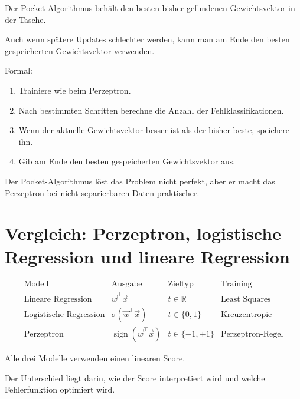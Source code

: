 \begin{conceptbox}
Der Pocket-Algorithmus behält den besten bisher gefundenen Gewichtsvektor in der Tasche.

Auch wenn spätere Updates schlechter werden, kann man am Ende den besten gespeicherten Gewichtsvektor verwenden.
\end{conceptbox}

Formal:

\begin{enumerate}
    \item Trainiere wie beim Perzeptron.
    \item Nach bestimmten Schritten berechne die Anzahl der Fehlklassifikationen.
    \item Wenn der aktuelle Gewichtsvektor besser ist als der bisher beste, speichere ihn.
    \item Gib am Ende den besten gespeicherten Gewichtsvektor aus.
\end{enumerate}

\begin{notebox}
Der Pocket-Algorithmus löst das Problem nicht perfekt, aber er macht das Perzeptron bei nicht separierbaren Daten praktischer.
\end{notebox}

\section{Vergleich: Perzeptron, logistische Regression und lineare Regression}

\[
\begin{array}{c|c|c|c}
\text{Modell}
&
\text{Ausgabe}
&
\text{Zieltyp}
&
\text{Training}
\\
\hline
\text{Lineare Regression}
&
\vec{w}^{\top}\vec{x}
&
t\in\mathbb{R}
&
\text{Least Squares}
\\
\hline
\text{Logistische Regression}
&
\sigma(\vec{w}^{\top}\vec{x})
&
t\in\{0,1\}
&
\text{Kreuzentropie}
\\
\hline
\text{Perzeptron}
&
\operatorname{sign}(\vec{w}^{\top}\vec{x})
&
t\in\{-1,+1\}
&
\text{Perzeptron-Regel}
\end{array}
\]

\begin{conceptbox}
Alle drei Modelle verwenden einen linearen Score.

Der Unterschied liegt darin, wie der Score interpretiert wird und welche Fehlerfunktion optimiert wird.
\end{conceptbox}

